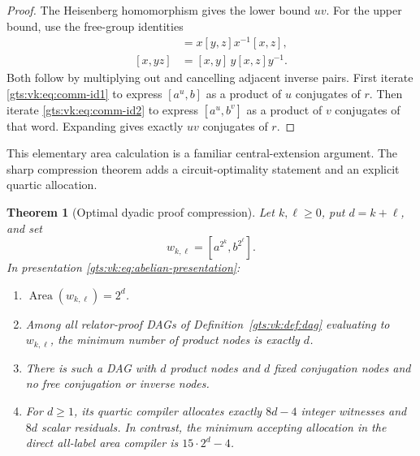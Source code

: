 \documentclass[11pt,letterpaper]{article}
\newtheorem{theorem}{Theorem}[section]
\theoremstyle{definition}
\theoremstyle{remark}
\newcommand{\Area}{\operatorname{Area}}
\begin{document}
\begin{proof}
The Heisenberg homomorphism gives the lower bound $uv$. For the upper bound, use the free-group identities
\begin{align}
 [xy,z]&=x[y,z]x^{-1}[x,z],\label{gts:vk:eq:comm-id1}\\
 [x,yz]&=[x,y]\,y[x,z]y^{-1}.\label{gts:vk:eq:comm-id2}
\end{align}
Both follow by multiplying out and cancelling adjacent inverse pairs. First iterate \eqref{gts:vk:eq:comm-id1} to express $[a^u,b]$ as a product of $u$ conjugates of $r$. Then iterate \eqref{gts:vk:eq:comm-id2} to express $[a^u,b^v]$ as a product of $v$ conjugates of that word. Expanding gives exactly $uv$ conjugates of $r$.
\end{proof}

This elementary area calculation is a familiar central-extension argument. The sharp compression theorem adds a circuit-optimality statement and an explicit quartic allocation.

\begin{theorem}[Optimal dyadic proof compression]\label{gts:vk:thm:grid}
Let $k,\ell\geq0$, put $d=k+\ell$, and set
\[
 w_{k,\ell}=[a^{2^k},b^{2^\ell}].
\]
In presentation \eqref{gts:vk:eq:abelian-presentation}:
\begin{enumerate}[label=(\roman*)]
\item $\Area(w_{k,\ell})=2^d$.
\item Among all relator-proof DAGs of Definition~\ref{gts:vk:def:dag} evaluating to $w_{k,\ell}$, the minimum number of product nodes is exactly $d$.
\item There is such a DAG with $d$ product nodes and $d$ fixed conjugation nodes and no free conjugation or inverse nodes.
\item For $d\geq1$, its quartic compiler allocates exactly $8d-4$ integer witnesses and $8d$ scalar residuals. In contrast, the minimum accepting allocation in the direct all-label area compiler is $15\cdot2^d-4$.
\end{enumerate}
\end{theorem}
\end{document}
